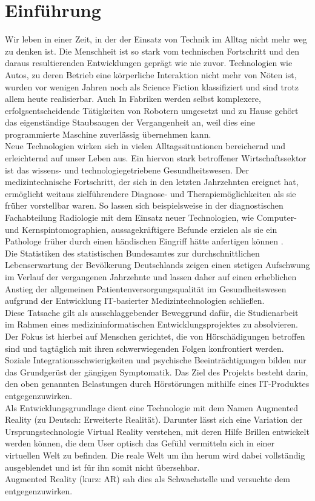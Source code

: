 \chapter{Einführung}
Wir leben in einer Zeit, in der der Einsatz von Technik im Alltag nicht mehr weg zu denken ist. Die Menschheit ist so stark vom technischen Fortschritt und den daraus resultierenden Entwicklungen geprägt wie nie zuvor.  
Technologien wie Autos, zu deren Betrieb eine körperliche Interaktion nicht mehr von Nöten ist, wurden vor wenigen Jahren noch als Science Fiction klassifiziert und sind trotz allem heute realisierbar. Auch In Fabriken werden selbst komplexere, erfolgsentscheidende Tätigkeiten von Robotern umgesetzt und zu Hause gehört das eigenständige Staubsaugen der Vergangenheit an, weil dies eine programmierte Maschine zuverlässig übernehmen kann. \\Neue Technologien wirken sich in vielen Alltagssituationen bereichernd und erleichternd auf unser Leben aus. Ein hiervon stark betroffener Wirtschaftssektor ist das wissens- und technologiegetriebene Gesundheitswesen. Der medizintechnische Fortschritt, der sich in den letzten Jahrzehnten ereignet hat, ermöglicht weitaus zielführendere Diagnose- und Therapiemöglichkeiten als sie früher vorstellbar waren. So lassen sich beispielsweise in der diagnostischen Fachabteilung Radiologie mit dem Einsatz neuer Technologien, wie Computer- und Kernspintomographien, aussagekräftigere Befunde erzielen als sie ein Pathologe früher durch einen händischen Eingriff hätte anfertigen können \cite[S.3]{buck_radiologie_2013}.\\Die Statistiken des statistischen Bundesamtes zur durchschnittlichen Lebenserwartung der Bevölkerung Deutschlands zeigen einen stetigen Aufschwung im Verlauf der vergangenen Jahrzehnte und lassen daher auf einen erheblichen Anstieg der allgemeinen Patientenversorgungsqualität im Gesundheitswesen aufgrund der Entwicklung IT-basierter Medizintechnologien schließen.\\ 
Diese Tatsache gilt als ausschlaggebender Beweggrund dafür, die Studienarbeit im Rahmen eines medizininformatischen Entwicklungsprojektes zu absolvieren. Der Fokus ist hierbei auf Menschen gerichtet, die von Hörschädigungen betroffen sind und tagtäglich mit ihren schwerwiegenden Folgen konfrontiert werden. Soziale Integrationsschwierigkeiten und psychische Beeinträchtigungen bilden nur das Grundgerüst der gängigen Symptomatik. Das Ziel des Projekts besteht darin, den oben genannten Belastungen durch Hörstörungen mithilfe eines IT-Produktes entgegenzuwirken.\\Als Entwicklungsgrundlage dient eine Technologie mit dem Namen Augmented Reality (zu Deutsch: Erweiterte Realität). Darunter lässt sich eine Variation der Ursprungstechnologie Virtual Reality verstehen, mit deren Hilfe Brillen entwickelt werden können, die dem User optisch das Gefühl vermitteln sich in einer virtuellen Welt zu befinden. Die reale Welt um ihn herum wird dabei vollständig ausgeblendet und ist für ihn somit nicht übersehbar.\\Augmented Reality (kurz: AR) sah dies als Schwachstelle und versuchte dem entgegenzuwirken. 
